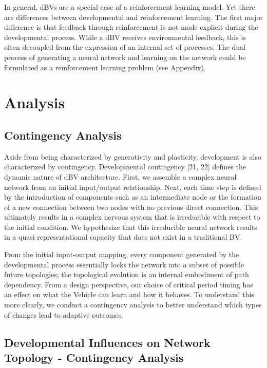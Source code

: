 \documentclass{article}
\begin{document}
In general, dBVs are a special case of a reinforcement learning model. Yet there are differences between developmental and reinforcement learning. The first major difference is that feedback through reinforcement is not made explicit during the developmental process. While a dBV receives environmental feedback, this is often decoupled from the expression of an internal set of processes. The dual process of generating a neural network and learning on the network could be formulated as a reinforcement learning problem (see Appendix).

\section{Analysis}

\subsection{Contingency Analysis}

Aside from being characterized by generativity and plasticity, development is also characterized by contingency. Developmental contingency [21, 22] defines the dynamic nature of dBV architecture. First, we assemble a complex neural network from an initial input/output relationship. Next, each time step is defined by the introduction of components such as an intermediate node or the formation of a new connection between two nodes with no previous direct connection. This ultimately results in a complex nervous system that is irreducible with respect to the initial condition. We hypothesize that this irreducible neural network results in a quasi-representational capacity that does not exist in a traditional BV. 

From the initial input-output mapping, every component generated by the developmental process essentially locks the network into a subset of possible future topologies; the topological evolution is an internal embodiment of path dependency. From a design perspective, our choice of critical period timing has an effect on what the Vehicle can learn and how it behaves. To understand this more clearly, we conduct a contingency analysis to better understand which types of changes lead to adaptive outcomes.

\subsection{Developmental Influences on Network Topology - Contingency Analysis}
\end{document}
